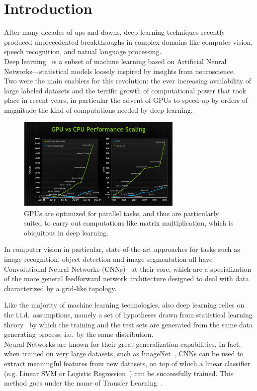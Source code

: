 \documentclass[../main.tex]{subfiles}
\begin{document}
    \chapter{Introduction}\label{chap:intro}
    \setcounter{page}{1}

    After many decades of ups and downs, deep learning techniques recently produced unprecedented breakthroughs
    in complex domains like computer vision, speech recognition, and natual language processing. \\
    Deep learning~\cite{deeplearning} is a subset of machine learning based on Artificial Neural Networks---statistical models loosely
    inspired by insights from neuroscience. \\
    Two were the main enablers for this revolution: the ever increasing availability of large labeled
    datasets and the terrific growth of computational power that took place in recent years, in particular
    the advent of GPUs to speed-up by orders of magnitude the kind of computations needed by deep learning.

    \begin{figure}[h!]
        \centering{}
        \includegraphics[width=300px]{img/gpu-vs-cpu.png}
        \caption{GPUs are optimized for parallel tasks, and thus are particularly suited to carry out computations
        like matrix multiplication, which is obiquitous in deep learning.}\label{fig:gpu-vs-cpu}
    \end{figure}

    In computer vision in particular, state-of-the-art approaches for tasks such as image recognition,
    object detection and image segmentation all have Convolutional Neural Networks (CNNs)~\cite{lecun-89e} at their core,
	which are a specialization of the more general feedforward network architecture designed to deal with data characterized
    by a grid-like topology.

    Like the majority of machine learning technologies, also deep learning relies on the i.i.d.\ assumptions, namely
    a set of hypotheses drawn from statistical learning theory~\cite{Vapnik1998} by which the training and the test sets are generated
    from the same data generating process, i.e.\ by the same distribution. \\
    Neural Networks are known for their great generalization capabilities. In fact, when trained on very large
    datasets, such as ImageNet~\cite{imagenet}, CNNs can be used to extract meaningful features from new datasets, on top of which
    a linear classifier (e.g. Linear SVM or Logistic Regression~\cite{fan2008liblinear}) can be successfully trained.
    This method goes under the name of Transfer Learning~\cite{transfer-learning}. \\
\end{document}
